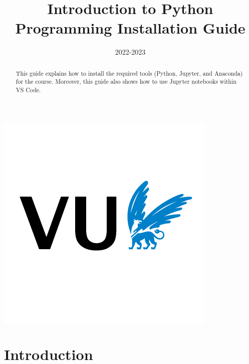 \documentclass{latex-template/tufte-handout}
\title{Introduction to Python Programming Installation Guide}
\date{2022-2023} %
\begin{document}
\maketitle%
\begin{marginfigure}[-4cm]%
  \includegraphics[width=\linewidth]{assets/vu}
\end{marginfigure}

\begin{abstract}
\noindent
This guide explains how to install the required tools (Python, Jupyter, and Anaconda) for the course.
Moreover, this guide also shows how to use Jupyter notebooks within VS Code.

\end{abstract}




\section{Introduction} \label{introduction}
\end{document}
